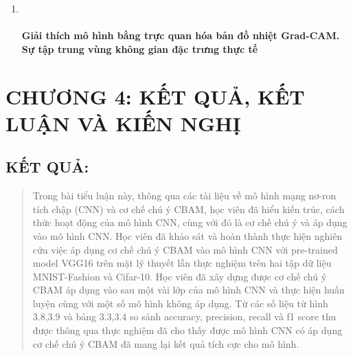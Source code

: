 \documentclass[
]{article}
\begin{document}
\begin{enumerate}
\begin{enumerate}
{    \paragraph{Phân tích hiện tượng suy giảm hiệu năng cục bộ CBAM-Local
    và ưu thế của giải pháp đề xuất
    CBAM-Hook}\label{phuxe2n-tuxedch-hiux1ec7n-tux1b0ux1ee3ng-suy-giux1ea3m-hiux1ec7u-nux103ng-cux1ee5c-bux1ed9-cbam-local-vuxe0-ux1b0u-thux1ebf-cux1ee7a-giux1ea3i-phuxe1p-ux111ux1ec1-xuux1ea5t-cbam-hook}}
  \item ~
    \hypertarget{giux1ea3i-thuxedch-muxf4-huxecnh-bux1eb1ng-trux1ef1c-quan-huxf3a-bux1ea3n-ux111ux1ed3-nhiux1ec7t-grad-cam.-sux1ef1-tux1eadp-trung-vuxf9ng-khuxf4ng-gian-ux111ux1eb7c-trux1b0ng-thux1ef1c-tux1ebf}{%
    \paragraph{Giải thích mô hình bằng trực quan hóa bản đồ nhiệt
    Grad-CAM. Sự tập trung vùng không gian đặc trưng thực
    tế}\label{giux1ea3i-thuxedch-muxf4-huxecnh-bux1eb1ng-trux1ef1c-quan-huxf3a-bux1ea3n-ux111ux1ed3-nhiux1ec7t-grad-cam.-sux1ef1-tux1eadp-trung-vuxf9ng-khuxf4ng-gian-ux111ux1eb7c-trux1b0ng-thux1ef1c-tux1ebf}}
  \end{enumerate}
\end{enumerate}

\hypertarget{chux1b0ux1a1ng-4-kux1ebft-quux1ea3-kux1ebft-luux1eadn-vuxe0-kiux1ebfn-nghux1ecb}{%
\section{CHƯƠNG 4: KẾT QUẢ, KẾT LUẬN VÀ KIẾN
NGHỊ}\label{chux1b0ux1a1ng-4-kux1ebft-quux1ea3-kux1ebft-luux1eadn-vuxe0-kiux1ebfn-nghux1ecb}}

\hypertarget{kux1ebft-quux1ea3}{%
\subsection{KẾT QUẢ:}\label{kux1ebft-quux1ea3}}

\begin{quote}
Trong bài tiểu luận này, thông qua các tài liệu về mô hình mạng nơ-ron
tích chập (CNN) và cơ chế chú ý CBAM, học viên đã hiểu kiến trúc, cách
thức hoạt động của mô hình CNN, cùng với đó là cơ chế chú ý và áp dụng
vào mô hình CNN. Học viên đã khảo sát và hoàn thành thực hiện nghiên cứu
việc áp dụng cơ chế chú ý CBAM vào mô hình CNN với pre-trained model
VGG16 trên mặt lý thuyết lẫn thực nghiệm trên hai tập dữ liệu
MNIST-Fashion và Cifar-10. Học viên đã xây dựng được cơ chế chú ý CBAM
áp dụng vào sau một vài lớp của mô hình CNN và thực hiện huấn luyện cùng
với một số mô hình không áp dụng. Từ các số liệu từ hình 3.8,3.9 và bảng
3.3,3.4 so sánh accuracy, precision, recall và f1 score thu được thông
qua thực nghiệm đã cho thấy được mô hình CNN có áp dụng cơ chế chú ý
CBAM đã mang lại kết quả tích cực cho mô hình.
\end{quote}
\end{document}
